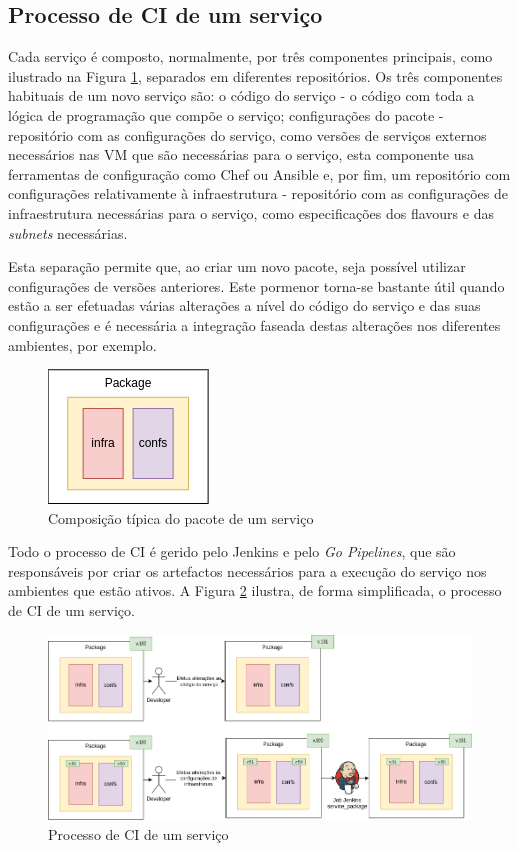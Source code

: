 \subsection{Processo de \ac{CI} de um serviço}

Cada serviço é composto, normalmente, por três componentes principais, como ilustrado na Figura
\ref{package}, separados em diferentes repositórios. Os três componentes habituais de um novo 
serviço são: o código do serviço - o código com toda a lógica de programação que compõe o serviço;
configurações do pacote - repositório com as configurações do serviço, como versões de serviços 
externos necessários nas \ac{VM} que são necessárias para o serviço, esta componente usa 
ferramentas de configuração como Chef \cite{chef} ou Ansible \cite{ansible} e, por fim, um 
repositório com configurações relativamente à infraestrutura - repositório com as configurações de 
infraestrutura necessárias para o serviço, como especificações dos \glspl{flavour} e das 
\textit{subnets} necessárias.

Esta separação permite que, ao criar um novo pacote, seja possível utilizar configurações de
versões anteriores. Este pormenor torna-se bastante útil quando estão a ser efetuadas várias
alterações a nível do código do serviço e das suas configurações e é necessária a integração 
faseada destas alterações nos diferentes ambientes, por exemplo.

\begin{figure}[H]
  \centerline{\includegraphics[scale=1.2]{media/content/impl/package.png}}
  \caption{Composição típica do pacote de um serviço}
  \label{package}
\end{figure}

Todo o processo de \ac{CI} é gerido pelo Jenkins e pelo \textit{Go Pipelines}, que são responsáveis
por criar os artefactos necessários para a execução do serviço nos ambientes que estão ativos. 
A Figura \ref{ci-process} ilustra, de forma simplificada, o processo de \ac{CI} de um serviço.

\begin{figure}[H]
  \centerline{\includegraphics[scale=0.5]{media/content/impl/ci-process.png}}
  \caption{Processo de \ac{CI} de um serviço}
  \label{ci-process}
\end{figure}

